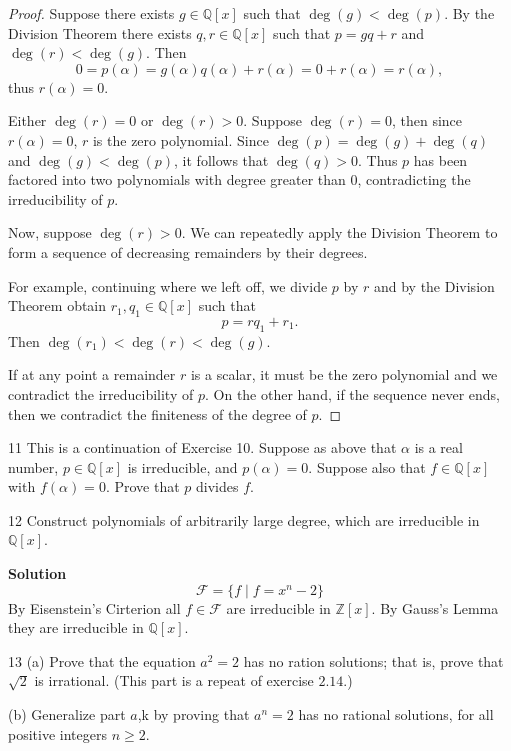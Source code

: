 \begin{proof}
    Suppose there exists $g \in \mathbb{Q}[x]$
        such that $\deg(g) < \deg(p)$.
    By the Division Theorem there exists $q, r \in \mathbb{Q}[x]$
        such that $p = g q + r$ and $\deg(r) < \deg(g)$.
    Then 
    \[0 = p(\alpha) = g(\alpha)q(\alpha) + r(\alpha) = 0 + r(\alpha) = r(\alpha),\]
    thus $r(\alpha) = 0$. 

    Either $\deg(r) = 0$ or $\deg(r) > 0$.
    Suppose $\deg(r) = 0$, then since $r(\alpha) = 0$, $r$ is the zero polynomial.
    Since $\deg(p) = \deg(g) + \deg(q)$ and $\deg(g) < \deg(p)$,
        it follows that $\deg(q) > 0$.
    Thus $p$ has been factored into two polynomials with degree 
        greater than $0$, contradicting the irreducibility of $p$.

    Now, suppose $\deg(r) > 0$. We can repeatedly apply the Division Theorem
        to form a sequence of decreasing remainders by their degrees.

    For example, continuing where we left off, we divide $p$ by $r$
        and by the Division Theorem obtain $r_1, q_1 \in \mathbb{Q}[x]$
        such that 
    \[p = rq_1 + r_1.\]
    Then $\deg(r_1) < \deg(r) < \deg(g)$.

    If at any point a remainder $r$ is a scalar, it must be the 
        zero polynomial and we contradict the irreducibility of $p$.
    On the other hand, if the sequence never ends, then we contradict the finiteness of
        the degree of $p$.
\end{proof}

\begin{problem}{11}
    This is a continuation of Exercise 10. Suppose as above that $\alpha$ is a real
    number, $p \in \mathbb{Q}[x]$ is irreducible, and $p(\alpha) = 0$. Suppose also that
    $f \in \mathbb{Q}[x]$ with $f(\alpha) = 0$. Prove that $p$ divides $f$.
\end{problem}
\unsolved

\begin{problem}{12}
    Construct polynomials of arbitrarily large degree,
        which are irreducible in $\mathbb{Q}[x]$.
\end{problem}
\solved

\textbf{Solution}
\[\mathcal{F} = \{f \mid f = x^n - 2\}\]
By Eisenstein's Cirterion all $f \in \mathcal{F}$
    are irreducible in $\mathbb{Z}[x]$.
By Gauss's Lemma they are irreducible in $\mathbb{Q}[x]$.

\begin{problem}{13}
    (a) Prove that the equation $a^2 = 2$ has no ration solutions;
        that is, prove that $\sqrt{2}$ is irrational. (This part is a 
        repeat of exercise $2.14$.)

    (b) Generalize part $a$,k by proving that $a^n = 2$ has no rational 
        solutions, for all positive integers $n \ge 2$.
\end{problem}
\solved

